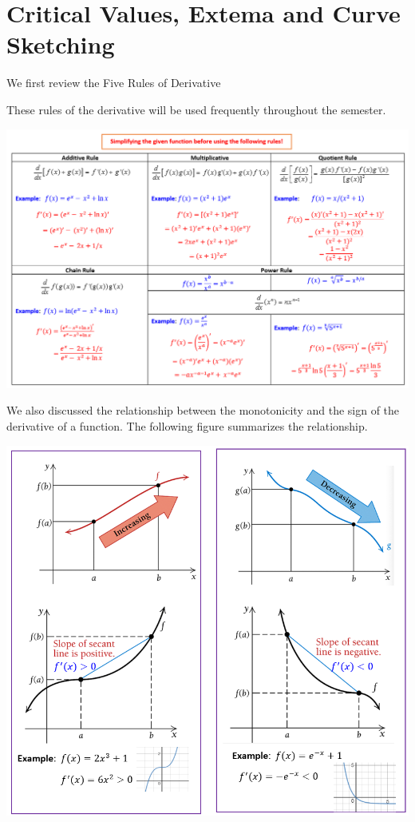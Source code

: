 \documentclass[
]{book}
\begin{document}
\hfill\break

\hypertarget{critical-values-extema-and-curve-sketching}{%
\chapter{Critical Values, Extema and Curve Sketching}\label{critical-values-extema-and-curve-sketching}}

We first review the Five Rules of Derivative

\hfill\break

These rules of the derivative will be used frequently throughout the semester.

\begin{center}\includegraphics[width=0.99\linewidth]{img08/w08-RuleDerivatives} \end{center}

We also discussed the relationship between the monotonicity and the sign of the derivative of a function. The following figure summarizes the relationship.

\begin{center}\includegraphics[width=0.85\linewidth]{img08/w08-monotonicitySignDerivatives} \end{center}
\end{document}
